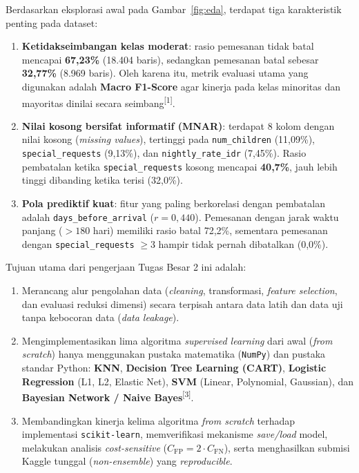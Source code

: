 \documentclass[11pt,a4paper]{article}
\numberwithin{figure}{section}
\numberwithin{table}{section}
\newcommand{\fnmark}[1]{\textsuperscript{[#1]}}
\begin{document}
Berdasarkan eksplorasi awal pada Gambar~\ref{fig:eda}, terdapat tiga karakteristik penting pada dataset:
\begin{enumerate}[leftmargin=1.4cm, itemsep=2pt]
  \item \textbf{Ketidakseimbangan kelas moderat}: rasio pemesanan tidak batal mencapai \textbf{67,23\%} (18.404 baris), sedangkan pemesanan batal sebesar \textbf{32,77\%} (8.969 baris). Oleh karena itu, metrik evaluasi utama yang digunakan adalah \textbf{Macro F1-Score} agar kinerja pada kelas minoritas dan mayoritas dinilai secara seimbang\fnmark{1}.
  \item \textbf{Nilai kosong bersifat informatif (MNAR)}: terdapat 8 kolom dengan nilai kosong (\textit{missing values}), tertinggi pada \texttt{num\_children} (11,09\%), \texttt{special\_requests} (9,13\%), dan \texttt{nightly\_rate\_idr} (7,45\%). Rasio pembatalan ketika \texttt{special\_requests} kosong mencapai \textbf{40,7\%}, jauh lebih tinggi dibanding ketika terisi (32,0\%).
  \item \textbf{Pola prediktif kuat}: fitur yang paling berkorelasi dengan pembatalan adalah \texttt{days\_before\_arrival} ($r = 0{,}440$). Pemesanan dengan jarak waktu panjang ($>180$ hari) memiliki rasio batal 72,2\%, sementara pemesanan dengan \texttt{special\_requests} $\ge 3$ hampir tidak pernah dibatalkan (0,0\%).
\end{enumerate}

Tujuan utama dari pengerjaan Tugas Besar 2 ini adalah:
\begin{enumerate}[leftmargin=1.4cm, itemsep=2pt]
  \item Merancang alur pengolahan data (\textit{cleaning}, transformasi, \textit{feature selection}, dan evaluasi reduksi dimensi) secara terpisah antara data latih dan data uji tanpa kebocoran data (\textit{data leakage}).
  \item Mengimplementasikan lima algoritma \textit{supervised learning} dari awal (\textit{from scratch}) hanya menggunakan pustaka matematika (\texttt{NumPy}) dan pustaka standar Python: \textbf{KNN}, \textbf{Decision Tree Learning (CART)}, \textbf{Logistic Regression} (L1, L2, Elastic Net), \textbf{SVM} (Linear, Polynomial, Gaussian), dan \textbf{Bayesian Network / Naive Bayes}\fnmark{3}.
  \item Membandingkan kinerja kelima algoritma \textit{from scratch} terhadap implementasi \texttt{scikit-learn}, memverifikasi mekanisme \textit{save/load} model, melakukan analisis \textit{cost-sensitive} ($C_{\text{FP}} = 2 \cdot C_{\text{FN}}$), serta menghasilkan submisi Kaggle tunggal (\textit{non-ensemble}) yang \textit{reproducible}.
\end{enumerate}
\end{document}
